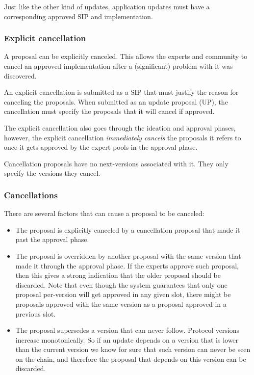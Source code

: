 Just like the other kind of updates, application updates must have a
corresponding approved SIP and implementation.

\subsubsection{Explicit cancellation}
\label{sec:explicit-cancellation}

A proposal can be explicitly canceled. This allows the experts and community to
cancel an approved implementation after a (significant) problem with it was
discovered.

An explicit cancellation is submitted as a SIP that must justify the reason for
canceling the proposals. When submitted as an update proposal (UP), the
cancellation must specify the proposals that it will cancel if approved.

The explicit cancellation also goes through the ideation and approval phases,
however, the explicit cancellation \emph{immediately cancels} the proposals it
refers to once it gets approved by the expert pools in the approval phase.

Cancellation proposals have no next-versions associated with it. They only
specify the versions they cancel.

\subsubsection{Cancellations}
\label{sec:cancellations}

There are several factors that can cause a proposal to be canceled:

\begin{itemize}
\item The proposal is explicitly canceled by a cancellation proposal that made
  it past the approval phase.
\item The proposal is overridden by another proposal with the same version that
  made it through the approval phase. If the experts approve such proposal, then
  this gives a strong indication that the older proposal should be discarded.
  Note that even though the system guarantees that only one proposal per-version
  will get approved in any given slot, there might be proposals approved with
  the same version as a proposal approved in a previous slot.
\item The proposal supersedes a version that can never follow. Protocol versions
  increase monotonically. So if an update depends on a version that is lower
  than the current version we know for sure that such version can never be seen
  on the chain, and therefore the proposal that depends on this version can be
  discarded.
\end{itemize}

